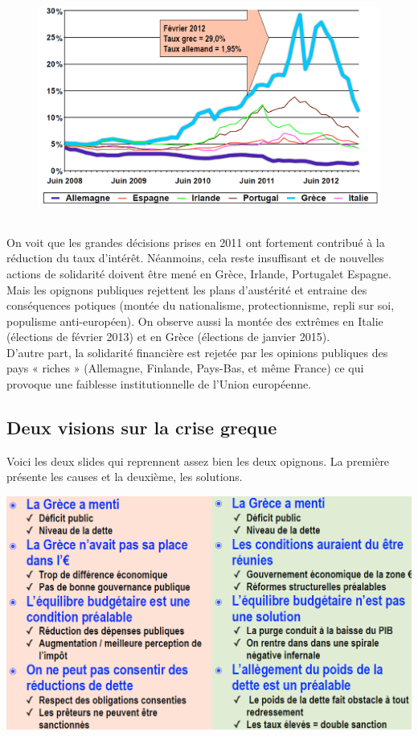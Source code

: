 \begin{figure}
	\includegraphics[scale=0.3]{40}
\end{figure}
\ \\ On voit que les grandes décisions prises en 2011 ont fortement contribué à la réduction du taux d'intérêt. Néanmoins, cela reste insuffisant et de nouvelles actions de solidarité doivent être mené en Grèce, Irlande, Portugalet Espagne. Mais les opignons publiques rejettent les plans d'austérité et entraine des conséquences potiques (montée du nationalisme, protectionnisme, repli sur soi, populisme anti-européen). On observe aussi la montée des extrêmes en Italie (élections de février 2013) et en Grèce (élections de janvier 2015). \\
D'autre part, la solidarité financière est rejetée par les opinions publiques des
pays « riches » (Allemagne, Finlande, Pays-Bas, et même France) ce qui provoque une faiblesse institutionnelle de l’Union européenne.

\subsection{Deux visions sur la crise greque}
Voici les deux slides qui reprennent assez bien les deux opignons. La première présente les causes et la deuxième, les solutions. 

\begin{center}
	\includegraphics[scale=0.5]{41}
\end{center}

